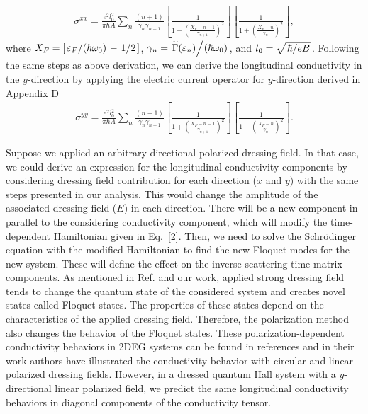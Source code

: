 \documentclass{article}
\begin{document}
\begin{itemize}
{\begin{equation}
    \begin{aligned}
      \sigma^{xx}  =
      \frac{e^2l_0^2}{\pi\hbar A}
      \sum_{n}
      \frac{(n+1)}{\gamma_{n}\gamma_{n+1}}
      \left[
        \frac{1}
        {
          1 + \left(\frac{X_F - n -1}{\gamma_{n+1}}\right)^2
        }
      \right]
      \left[
        \frac{1}
        {
          1 + \left(\frac{X_F - n}{\gamma_{n}}\right)^2
        }
      \right],
    \end{aligned}
  \end{equation}
  where $X_F = \left[\flatfrac{\varepsilon_F}{(\hbar \omega_0)} - \flatfrac{1}{2}\right]$,
  $\gamma_n = \flatfrac{\widetilde{{\Gamma}}(\varepsilon_n)}{(\hbar \omega_0)}$, and $l_0 = \sqrt{\flatfrac{\hbar}{eB}}$.
  Following the same steps as above derivation, we can derive the longitudinal conductivity in the $y$-direction by applying the electric current operator for $y$-direction derived in Appendix D
  \begin{equation} \tag{36}
    \begin{aligned}
      {\sigma}^{yy} =
      \frac{e^2l_0^2}{\pi\hbar A}
      \sum_{n}
      \frac{(n+1)}{\gamma_{n}\gamma_{n+1}}
      \left[
        \frac{1}
        {
          1 + \left(\frac{X_F - n -1}{\gamma_{n+1}}\right)^2
        }
      \right]
      \left[
        \frac{1}
        {
          1 + \left(\frac{X_F - n}{\gamma_{n}}\right)^2
        }
      \right].
    \end{aligned}
  \end{equation}
  }
\end{itemize}

Suppose we applied an arbitrary directional polarized dressing field. In that case, we could derive an expression for the longitudinal conductivity components by considering dressing field contribution for each direction ($x$ and $y$) with the same steps presented in our analysis. This would change the amplitude of the associated dressing field ($E$) in each direction. There will be a new component in parallel to the considering conductivity component, which will modify the time-dependent Hamiltonian given in Eq.~[2]. Then, we need to solve the Schrödinger equation with the modified Hamiltonian to find the new Floquet modes for the new system. These will define the effect on the inverse scattering time matrix components. As mentioned in Ref. \cite{wackerl20} and our work, applied strong dressing field tends to change the quantum state of the considered system and creates novel states called Floquet states. The properties of these states depend on the characteristics of the applied dressing field. Therefore, the polarization method also changes the behavior of the Floquet states. These polarization-dependent conductivity behaviors in 2DEG systems can be found in references \cite{wackerl20,morina15} and in their work authors have illustrated the conductivity behavior with circular and linear polarized dressing fields. However, in a dressed quantum Hall system with a $y$-directional linear polarized field, we predict the same longitudinal conductivity behaviors in diagonal components of the conductivity tensor.
\end{document}
